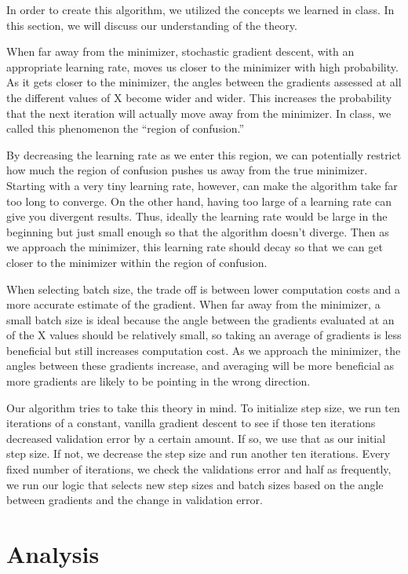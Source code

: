 \documentclass{article}
\begin{document}
\par In order to create this algorithm, we utilized the concepts we learned in class. In this section, we will discuss our understanding of the theory. 
\par When far away from the minimizer, stochastic gradient descent, with an appropriate learning rate, moves us closer to the minimizer with high probability. As it gets closer to the minimizer, the angles between the gradients assessed at all the different values of X become wider and wider. This increases the probability that the next iteration will actually move away from the minimizer. In class, we called this phenomenon the ``region of confusion.''
\par By decreasing the learning rate as we enter this region, we can potentially restrict how much the region of confusion pushes us away from the true minimizer. Starting with a very tiny learning rate, however, can make the algorithm take far too long to converge. On the other hand, having too large of a learning rate can give you divergent results. Thus, ideally the learning rate would be large in the beginning but just small enough so that the algorithm doesn't diverge. Then as we approach the minimizer, this learning rate should decay so that we can get closer to the minimizer within the region of confusion. 
\par When selecting batch size, the trade off is between lower computation costs and a more accurate estimate of the gradient. When far away from the minimizer, a small batch size is ideal because the angle between the gradients evaluated at an of the X values should be relatively small, so taking an average of gradients is less beneficial but still increases computation cost. As we approach the minimizer, the angles between these gradients increase, and averaging will be more beneficial as more gradients are likely to be pointing in the wrong direction. 
\par Our algorithm tries to take this theory in mind. To initialize step size, we run ten iterations of a constant, vanilla gradient descent to see if those ten iterations decreased validation error by a certain amount. If so, we use that as our initial step size. If not, we decrease the step size and run another ten iterations. Every fixed number of iterations, we check the validations error and half as frequently, we run our logic that selects new step sizes and batch sizes based on the angle between gradients and the change in validation error.

\section{Analysis}
\end{document}
